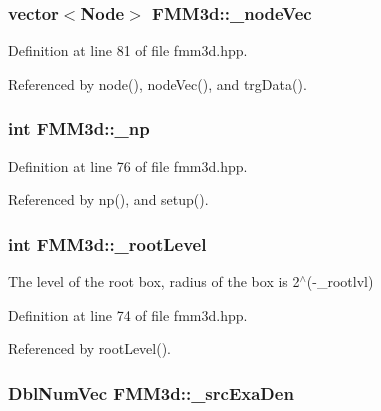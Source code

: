 \subsubsection{\setlength{\rightskip}{0pt plus 5cm}vector$<${\bf Node}$>$ {\bf FMM3d::\_\-node\-Vec}\hspace{0.3cm}{\tt  [protected]}}\label{classFMM3d_0dca3d8b42eecae5aeb38ed9545698e8_0dca3d8b42eecae5aeb38ed9545698e8}




Definition at line 81 of file fmm3d.hpp.

Referenced by node(), node\-Vec(), and trg\-Data().
\subsubsection{\setlength{\rightskip}{0pt plus 5cm}int {\bf FMM3d::\_\-np}\hspace{0.3cm}{\tt  [protected]}}\label{classFMM3d_3d05941198fa7da648bc68ddd5d0b5c1_3d05941198fa7da648bc68ddd5d0b5c1}




Definition at line 76 of file fmm3d.hpp.

Referenced by np(), and setup().
\subsubsection{\setlength{\rightskip}{0pt plus 5cm}int {\bf FMM3d::\_\-root\-Level}\hspace{0.3cm}{\tt  [protected]}}\label{classFMM3d_01d82a06559beb8e8d5421992d7793ff_01d82a06559beb8e8d5421992d7793ff}


The level of the root box, radius of the box is 2$^\wedge$(-\_\-rootlvl) 

Definition at line 74 of file fmm3d.hpp.

Referenced by root\-Level().
\subsubsection{\setlength{\rightskip}{0pt plus 5cm}Dbl\-Num\-Vec {\bf FMM3d::\_\-src\-Exa\-Den}\hspace{0.3cm}{\tt  [protected]}}\label{classFMM3d_1ec79ec09360aeb3a857f5736dd32d52_1ec79ec09360aeb3a857f5736dd32d52}


